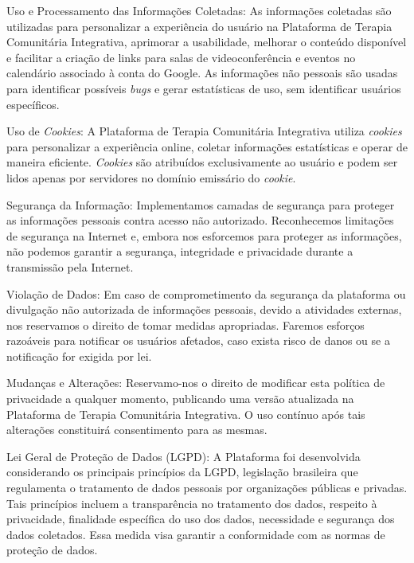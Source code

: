 \begin{apendicesenv}
        Uso e Processamento das Informações Coletadas:
        As informações coletadas são utilizadas para personalizar a experiência do usuário na Plataforma de Terapia Comunitária Integrativa, aprimorar a usabilidade, melhorar o conteúdo disponível e facilitar a criação de links para salas de videoconferência e eventos no calendário associado à conta do Google. As informações não pessoais são usadas para identificar possíveis \textit{bugs} e gerar estatísticas de uso, sem identificar usuários específicos.
        
        Uso de \textit{Cookies}:
        A Plataforma de Terapia Comunitária Integrativa utiliza \textit{cookies} para personalizar a experiência online, coletar informações estatísticas e operar de maneira eficiente. \textit{Cookies} são atribuídos exclusivamente ao usuário e podem ser lidos apenas por servidores no domínio emissário do \textit{cookie}.
        
        Segurança da Informação:
        Implementamos camadas de segurança para proteger as informações pessoais contra acesso não autorizado. Reconhecemos limitações de segurança na Internet e, embora nos esforcemos para proteger as informações, não podemos garantir a segurança, integridade e privacidade durante a transmissão pela Internet.
        
        Violação de Dados:
        Em caso de comprometimento da segurança da plataforma ou divulgação não autorizada de informações pessoais, devido a atividades externas, nos reservamos o direito de tomar medidas apropriadas. Faremos esforços razoáveis para notificar os usuários afetados, caso exista risco de danos ou se a notificação for exigida por lei.
        
        Mudanças e Alterações:
        Reservamo-nos o direito de modificar esta política de privacidade a qualquer momento, publicando uma versão atualizada na Plataforma de Terapia Comunitária Integrativa. O uso contínuo após tais alterações constituirá consentimento para as mesmas.
        
        Lei Geral de Proteção de Dados (LGPD):
        A Plataforma foi desenvolvida considerando os principais princípios da LGPD, legislação brasileira que regulamenta o tratamento de dados pessoais por organizações públicas e privadas. Tais princípios incluem a transparência no tratamento dos dados, respeito à privacidade, finalidade específica do uso dos dados, necessidade e segurança dos dados coletados. Essa medida visa garantir a conformidade com as normas de proteção de dados.
        

\end{apendicesenv}
